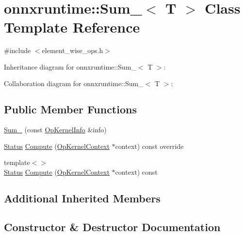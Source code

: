 \hypertarget{classonnxruntime_1_1Sum__8}{}\section{onnxruntime\+:\+:Sum\+\_$<$ T $>$ Class Template Reference}
\label{classonnxruntime_1_1Sum__8}


{\ttfamily \#include $<$element\+\_\+wise\+\_\+ops.\+h$>$}



Inheritance diagram for onnxruntime\+:\+:Sum\+\_$<$ T $>$\+:


Collaboration diagram for onnxruntime\+:\+:Sum\+\_$<$ T $>$\+:
\subsection*{Public Member Functions}
\begin{DoxyCompactItemize}
\item 
\mbox{\hyperlink{classonnxruntime_1_1Sum__8_a76092c04f070664219fbf05e92081582}{Sum\+\_}} (const \mbox{\hyperlink{classonnxruntime_1_1OpKernelInfo}{Op\+Kernel\+Info}} \&info)
\item 
\mbox{\hyperlink{classonnxruntime_1_1common_1_1Status}{Status}} \mbox{\hyperlink{classonnxruntime_1_1Sum__8_adf40238e59455d0cdb97d0477c0bcbb4}{Compute}} (\mbox{\hyperlink{classonnxruntime_1_1OpKernelContext}{Op\+Kernel\+Context}} $\ast$context) const override
\item 
{\footnotesize template$<$$>$ }\\\mbox{\hyperlink{classonnxruntime_1_1common_1_1Status}{Status}} \mbox{\hyperlink{classonnxruntime_1_1Sum__8_a595e027371b8ae64302a0164d9d35b2c}{Compute}} (\mbox{\hyperlink{classonnxruntime_1_1OpKernelContext}{Op\+Kernel\+Context}} $\ast$context) const
\end{DoxyCompactItemize}
\subsection*{Additional Inherited Members}


\subsection{Constructor \& Destructor Documentation}
\mbox{\label{classonnxruntime_1_1Sum__8_a76092c04f070664219fbf05e92081582}} 
